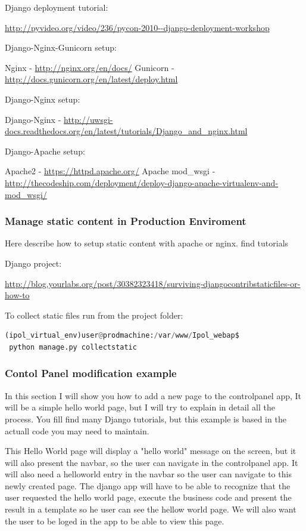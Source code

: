 Django deployment tutorial:

\url{http://pyvideo.org/video/236/pycon-2010--django-deployment-workshop}


Django-Nginx-Gunicorn setup:

Nginx - \url{http://nginx.org/en/docs/}
Gunicorn - \url{http://docs.gunicorn.org/en/latest/deploy.html}


Django-Nginx setup:

Django-Nginx - \url{http://uwsgi-docs.readthedocs.org/en/latest/tutorials/Django_and_nginx.html}


Django-Apache setup:

Apache2 - \url{https://httpd.apache.org/}
Apache mod\_wsgi - \url{http://thecodeship.com/deployment/deploy-django-apache-virtualenv-and-mod_wsgi/}



\subsubsection{Manage static content in Production Enviroment }
Here describe how to setup static content with apache or nginx. find tutorials

Django project:

\url{http://blog.yourlabs.org/post/30382323418/surviving-djangocontribstaticfiles-or-how-to}

To collect static files run from the project folder:

\begin{lstlisting}[language=Python,firstnumber=1]
 (ipol_virtual_env)user@prodmachine:/var/www/Ipol_webap$ 
 python manage.py collectstatic
\end{lstlisting}


\subsubsection{Contol Panel modification example}

In this section I will show you how to add a new page to the controlpanel app, 
It will be a simple hello world page, but I will try to explain in detail all the process.
You fill find many Django tutorials, but this example is based in the actuall code you may need to maintain.

This Hello World page will display a "hello world" message on the screen, but it will also present the navbar, so the user can navigate in the controlpanel app. 
It will also need a helloworld entry in the navbar so the user can navigate to this newly created page. The django app will have to be able to recognize that the user requested the hello world page, execute the business code and present the result in a template so he user can see the hellow world page.
We will also want the user to be loged in the app to be able to view this page.
 
